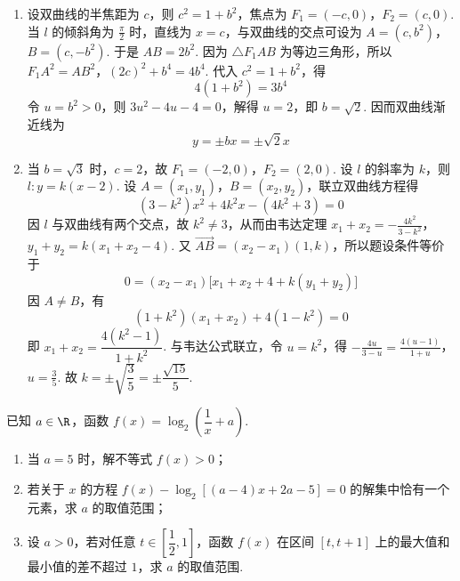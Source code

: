 \begin{solution}
\begin{enumerate}
\item 设双曲线的半焦距为 \(c\)，则 \(c^2=1+b^2\)，焦点为 \(F_1=(-c,0)\)，\(F_2=(c,0)\). 当 \(l\) 的倾斜角为 \(\frac{\pi}{2}\) 时，直线为 \(x=c\)，与双曲线的交点可设为
\(A=(c,b^2)\)，\(B=(c,-b^2)\).
于是 \(AB=2b^2\). 因为 \(\triangle F_1AB\) 为等边三角形，所以
\(F_1A^2=AB^2\)，\((2c)^2+b^4=4b^4\).
代入 \(c^2=1+b^2\)，得
\[
4(1+b^2)=3b^4
\]
令 \(u=b^2>0\)，则 \(3u^2-4u-4=0\)，解得 \(u=2\)，即 \(b=\sqrt2\). 因而双曲线渐近线为
\[
y=\pm bx=\pm\sqrt2x
\]
\item 当 \(b=\sqrt3\) 时，\(c=2\)，故 \(F_1=(-2,0)\)，\(F_2=(2,0)\). 设 \(l\) 的斜率为 \(k\)，则 \(l:y=k(x-2)\). 设 \(A=(x_1,y_1)\)，\(B=(x_2,y_2)\)，联立双曲线方程得
\[
(3-k^2)x^2+4k^2x-(4k^2+3)=0
\]
因 \(l\) 与双曲线有两个交点，故 \(k^2\ne3\)，从而由韦达定理
\(x_1+x_2=-\frac{4k^2}{3-k^2}\)，\(y_1+y_2=k(x_1+x_2-4)\).
又 \(\overrightarrow{AB}=(x_2-x_1)(1,k)\)，所以题设条件等价于
\[
0=(x_2-x_1)\bigl[x_1+x_2+4+k(y_1+y_2)\bigr]
\]
因 \(A\ne B\)，有
\[
(1+k^2)(x_1+x_2)+4(1-k^2)=0
\]
即 \(x_1+x_2=\dfrac{4(k^2-1)}{1+k^2}\). 与韦达公式联立，令 \(u=k^2\)，得
\(-\frac{4u}{3-u}=\frac{4(u-1)}{1+u}\)，\(u=\frac35\).
故 \(k=\pm\sqrt{\dfrac35}=\pm\dfrac{\sqrt{15}}5\).
\end{enumerate}
\end{solution}

\begin{problem}

已知 \(a\in\R\)，函数 \(f(x)=\log_2\!\left(\dfrac1x+a\right)\).

\begin{enumerate}
\item 当 \(a=5\) 时，解不等式 \(f(x)>0\)；
\item 若关于 \(x\) 的方程 \(f(x)-\log_2[(a-4)x+2a-5]=0\) 的解集中恰有一个元素，求 \(a\) 的取值范围；
\item 设 \(a>0\)，若对任意 \(t\in\left[\dfrac12,1\right]\)，函数 \(f(x)\) 在区间 \([t,t+1]\) 上的最大值和最小值的差不超过 \(1\)，求 \(a\) 的取值范围.
\end{enumerate}
\end{problem}

